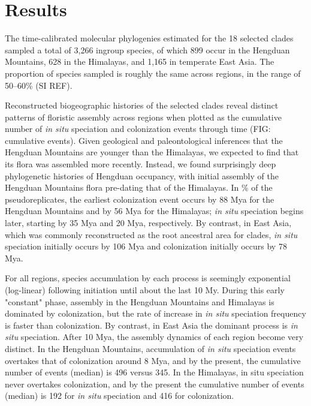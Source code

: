 \section{Results}

The time-calibrated molecular phylogenies estimated for the 18 selected clades sampled a total of 3,266 ingroup species, of which 899 occur in the Hengduan Mountains, 628 in the Himalayas, and 1,165 in temperate East Asia. The proportion of species sampled is roughly the same across regions, in the range of 50--60\% (SI REF).

Reconstructed biogeographic histories of the selected clades reveal distinct patterns of floristic assembly across regions when plotted as the cumulative number of \textit{in situ} speciation and colonization events through time (FIG: cumulative events). Given geological and paleontological inferences that the Hengduan Mountains are younger than the Himalayas, we expected to find that its flora was assembled more recently. Instead, we found surprisingly deep phylogenetic histories of Hengduan occupancy, with initial assembly of the Hengduan Mountains flora pre-dating that of the Himalayas. In \% of the pseudoreplicates, the earliest colonization event occurs by 88 Mya for the Hengduan Mountains and by 56 Mya for the Himalayas; \textit{in situ} speciation begins later, starting by 35 Mya and 20 Mya, respectively. By contrast, in East Asia, which was commonly reconstructed as the root ancestral area for clades, \textit{in situ} speciation initially occurs by 106 Mya and colonization initially occurs by 78 Mya.

For all regions, species accumulation by each process is seemingly exponential (log-linear) following initiation until about the last 10 My. During this early "constant" phase, assembly in the Hengduan Mountains and Himalayas is dominated by colonization, but the rate of increase in \textit{in situ} speciation frequency is faster than colonization. By contrast, in East Asia the dominant process is \textit{in situ} speciation.  After 10 Mya, the assembly dynamics of each region become very distinct. In the Hengduan Mountains, accumulation of \textit{in situ} speciation events overtakes that of colonization around 8 Mya, and by the present, the cumulative number of events (median) is 496 versus 345. In the Himalayas, in situ speciation never overtakes colonization, and by the present the cumulative number of events (median) is 192 for \textit{in situ} speciation and 416 for colonization.